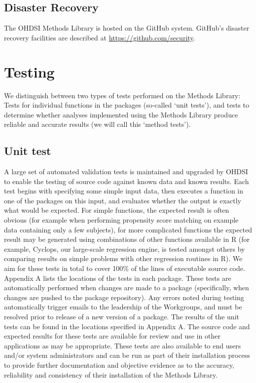 \documentclass[]{book}
\begin{document}
\subsection{Disaster Recovery}\label{disaster-recovery}

The OHDSI Methods Library is hosted on the GitHub system. GitHub's
disaster recovery facilities are described at
\url{https://github.com/security}.

\section{Testing}\label{testing}

We distinguish between two types of tests performed on the Methods
Library: Tests for individual functions in the packages (so-called `unit
tests'), and tests to determine whether analyses implemented using the
Methods Library produce reliable and accurate results (we will call this
`method tests').

\subsection{Unit test}\label{unit-test}

A large set of automated validation tests is maintained and upgraded by
OHDSI to enable the testing of source code against known data and known
results. Each test begins with specifying some simple input data, then
executes a function in one of the packages on this input, and evaluates
whether the output is exactly what would be expected. For simple
functions, the expected result is often obvious (for example when
performing propensity score matching on example data containing only a
few subjects), for more complicated functions the expected result may be
generated using combinations of other functions available in R (for
example, Cyclops, our large-scale regression engine, is tested amongst
others by comparing results on simple problems with other regression
routines in R). We aim for these tests in total to cover 100\% of the
lines of executable source code. Appendix A lists the locations of the
tests in each package. These tests are automatically performed when
changes are made to a package (specifically, when changes are pushed to
the package repository). Any errors noted during testing automatically
trigger emails to the leadership of the Workgroups, and must be resolved
prior to release of a new version of a package. The results of the unit
tests can be found in the locations specified in Appendix A. The source
code and expected results for these tests are available for review and
use in other applications as may be appropriate. These tests are also
available to end users and/or system administrators and can be run as
part of their installation process to provide further documentation and
objective evidence as to the accuracy, reliability and consistency of
their installation of the Methods Library.
\end{document}
